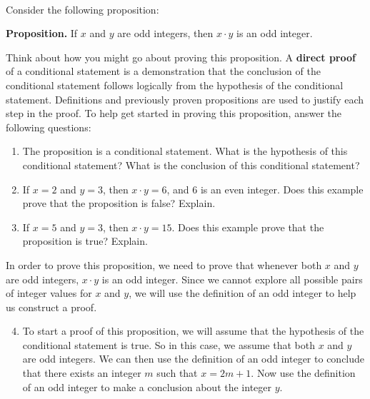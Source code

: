 \begin{previewactivity}\label{PA:thinking} \hfill \\
Consider the following proposition:  
\begin{flushleft}
\textbf{Proposition.}  If  $x$  and  $y$  are odd integers, then $ x \cdot y$  is an odd integer.
\end{flushleft}
Think about how you might go about proving this proposition. A \textbf{direct proof}
%
%
 of a conditional statement is a demonstration that the conclusion of the conditional statement follows logically from the hypothesis of the conditional statement.  Definitions and previously proven propositions are used to justify each step in the proof.    To help get started in proving this proposition, answer the following questions:
\begin{enumerate}
  \item The proposition is a conditional statement.  What is the hypothesis of this conditional statement?  What is the conclusion of this conditional statement?
  \item If  $x = 2$ and  $y = 3$, then  $x \cdot y = 6$, and 6 is an even integer.  Does this example prove that the proposition is false?  Explain.
  \item If  $x = 5$ and  $y = 3$, then  $x \cdot y = 15$.  Does this example prove that the proposition is true?  Explain.
\end{enumerate}
In order to prove this proposition, we need to prove that whenever both $x$ and $y$ are odd integers, 
$x \cdot y$ is an odd integer.  Since we cannot explore all possible pairs of integer values for $x$ and $y$, we will use the definition of an odd integer to help us construct a proof.  

\begin{enumerate} \setcounter{enumi}{3}
  \item To start a proof of this proposition, we will assume that the hypothesis of the conditional statement is true.  So in this case, we assume that both $x$ and $y$ are odd integers.  We can then use the definition of an odd integer to conclude that there exists an integer $m$ such that $x = 2m + 1$.  Now use the definition of an odd integer to make a conclusion about the integer $y$.
\label{PA:prev12-Q4}


\end{enumerate}
\end{previewactivity}
